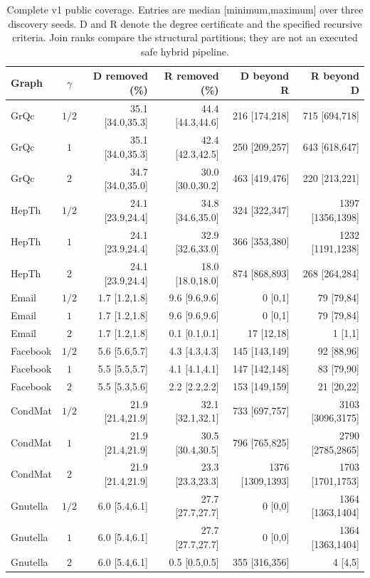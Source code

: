 \documentclass[sigconf,anonymous,review]{acmart}
\newcommand{\1}{\mathbf{1}}
\begin{document}
\begin{table}[t]
\caption{Complete v1 public coverage. Entries are median [minimum,maximum] over three discovery seeds. D and R denote the degree certificate and the specified recursive criteria. Join ranks compare the structural partitions; they are not an executed safe hybrid pipeline.}\label{tab:coverage-details}
\centering\small
\begin{tabular}{lcrrrr}\toprule
Graph & $\gamma$ & D removed (\%) & R removed (\%) & D beyond R & R beyond D\\\midrule
GrQc & $1/2$ & 35.1 [34.0,35.3] & 44.4 [44.3,44.6] & 216 [174,218] & 715 [694,718]\\
GrQc & $1$ & 35.1 [34.0,35.3] & 42.4 [42.3,42.5] & 250 [209,257] & 643 [618,647]\\
GrQc & $2$ & 34.7 [34.0,35.0] & 30.0 [30.0,30.2] & 463 [419,476] & 220 [213,221]\\
HepTh & $1/2$ & 24.1 [23.9,24.4] & 34.8 [34.6,35.0] & 324 [322,347] & 1397 [1356,1398]\\
HepTh & $1$ & 24.1 [23.9,24.4] & 32.9 [32.6,33.0] & 366 [353,380] & 1232 [1191,1238]\\
HepTh & $2$ & 24.1 [23.9,24.4] & 18.0 [18.0,18.0] & 874 [868,893] & 268 [264,284]\\
Email & $1/2$ & 1.7 [1.2,1.8] & 9.6 [9.6,9.6] & 0 [0,1] & 79 [79,84]\\
Email & $1$ & 1.7 [1.2,1.8] & 9.6 [9.6,9.6] & 0 [0,1] & 79 [79,84]\\
Email & $2$ & 1.7 [1.2,1.8] & 0.1 [0.1,0.1] & 17 [12,18] & 1 [1,1]\\
Facebook & $1/2$ & 5.6 [5.6,5.7] & 4.3 [4.3,4.3] & 145 [143,149] & 92 [88,96]\\
Facebook & $1$ & 5.5 [5.5,5.7] & 4.1 [4.1,4.1] & 147 [142,148] & 83 [79,90]\\
Facebook & $2$ & 5.5 [5.3,5.6] & 2.2 [2.2,2.2] & 153 [149,159] & 21 [20,22]\\
CondMat & $1/2$ & 21.9 [21.4,21.9] & 32.1 [32.1,32.1] & 733 [697,757] & 3103 [3096,3175]\\
CondMat & $1$ & 21.9 [21.4,21.9] & 30.5 [30.4,30.5] & 796 [765,825] & 2790 [2785,2865]\\
CondMat & $2$ & 21.9 [21.4,21.9] & 23.3 [23.3,23.3] & 1376 [1309,1393] & 1703 [1701,1753]\\
Gnutella & $1/2$ & 6.0 [5.4,6.1] & 27.7 [27.7,27.7] & 0 [0,0] & 1364 [1363,1404]\\
Gnutella & $1$ & 6.0 [5.4,6.1] & 27.7 [27.7,27.7] & 0 [0,0] & 1364 [1363,1404]\\
Gnutella & $2$ & 6.0 [5.4,6.1] & 0.5 [0.5,0.5] & 355 [316,356] & 4 [4,5]\\
\bottomrule\end{tabular}
\end{table}
\end{document}

